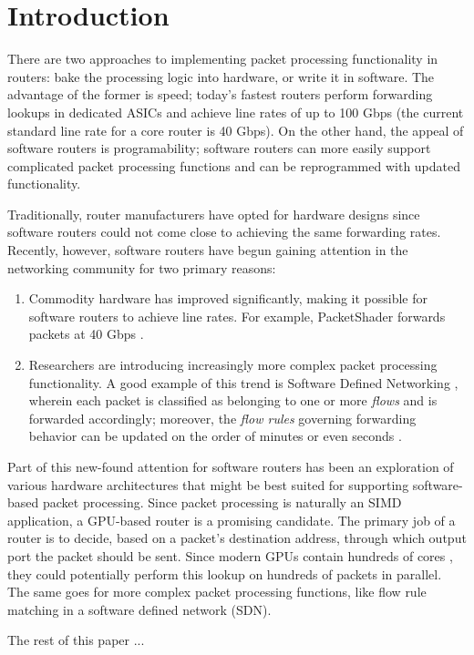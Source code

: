 \section{Introduction}

There are two approaches to implementing packet processing functionality in
routers: bake the processing logic into hardware, or write it in software. The
advantage of the former is speed; today's fastest routers perform forwarding
lookups in dedicated ASICs and achieve line rates of up to 100 Gbps (the
current standard line rate for a core router is 40 Gbps)\cite{Han}. On the
other hand, the appeal of software routers is programability; software routers
can more easily support complicated packet processing functions and can be
reprogrammed with updated functionality.

Traditionally, router manufacturers have opted for hardware designs since
software routers could not come close to achieving the same forwarding rates.
Recently, however, software routers have begun gaining attention in the
networking community for two primary reasons:
\begin{enumerate}
	\item Commodity hardware has improved significantly, making it possible for
	software routers to achieve line rates. For example, PacketShader forwards
	packets at 40 Gbps \cite{Han}.

	\item Researchers are introducing increasingly more complex packet
	processing functionality. A good example of this trend is Software Defined
	Networking \cite{OpenFlow}, wherein each packet is classified as belonging to
	one or more \emph{flows} and is forwarded accordingly; moreover, the
	\emph{flow rules} governing forwarding behavior can be updated on the order
	of minutes \cite{OpenFlow} or even seconds \cite{Jafarian}.
\end{enumerate}

Part of this new-found attention for software routers has been an exploration
of various hardware architectures that might be best suited for supporting
software-based packet processing. Since packet processing is naturally an SIMD
application, a GPU-based router is a promising candidate. The primary job of a
router is to decide, based on a packet's destination address, through which
output port the packet should be sent. Since modern GPUs contain hundreds of
cores \cite{Ryoo}, they could potentially perform this lookup on hundreds of
packets in parallel. The same goes for more complex packet processing
functions, like flow rule matching in a software defined network (SDN).


The rest of this paper ... 

